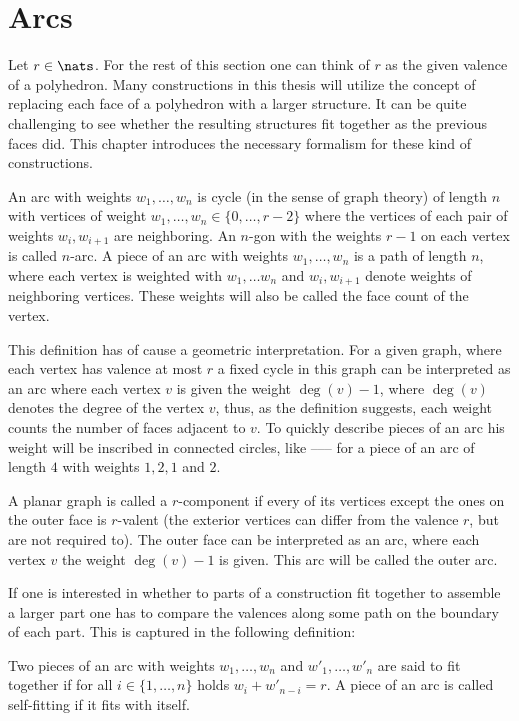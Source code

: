 \section{Arcs}

Let $r \in \nats$. For the rest of this section one can think of $r$ as the given valence of a polyhedron. Many constructions in this thesis will utilize the concept of replacing each face of a polyhedron with a larger structure. It can be quite challenging to see whether the resulting structures fit together as the previous faces did. This chapter introduces the necessary formalism for these kind of constructions.

\begin{definition}[Arc]
  An arc with weights $w_1, \dots, w_n$ is cycle (in the sense of graph theory) of length $n$ with vertices of weight $w_1, \dots, w_n \in \{0, \dots, r - 2\}$ where the vertices of each pair of weights $w_i, w_{i+1}$ are neighboring. An $n$-gon with the weights $r-1$ on each vertex is called $n$-arc. A piece of an arc with weights $w_1, \dots, w_n$ is a path of length $n$, where each vertex is weighted with $w_1, \dots w_n$ and $w_i, w_{i+1}$ denote weights of neighboring vertices. These weights will also be called the face count of the vertex. 
\end{definition}

This definition has of cause a geometric interpretation. For a given graph, where each vertex has valence at most $r$ a fixed cycle in this graph can be interpreted as an arc where each vertex $v$ is given the weight $\deg (v) - 1$, where $\deg (v)$ denotes the degree of the vertex $v$, thus, as the definition suggests, each weight counts the number of faces adjacent to $v$. To quickly describe pieces of an arc his weight will be inscribed in connected circles, like  ------ for a piece of an arc of length $4$ with weights $1, 2, 1$ and $2$.
\begin{definition}
  A planar graph is called a $r$-component if every of its vertices except the ones on the outer face is $r$-valent (the exterior vertices can differ from the valence $r$, but are not required to). The outer face can be interpreted as an arc, where each vertex $v$ the weight $\deg(v) - 1$ is given. This arc will be called the outer arc.
\end{definition}

If one is interested in whether to parts of a construction fit together to assemble a larger part one has to compare the valences along some path on the boundary of each part. This is captured in the following definition:
\begin{definition}
  Two pieces of an arc with weights $w_1, \dots, w_{n}$ and $w'_1, \dots, w'_{n}$ are said to fit together if for all $i \in \{1, \dots, n \}$ holds $w_i + w'_{n-i} = r$. A piece of an arc is called self-fitting if it fits with itself.
\end{definition}

